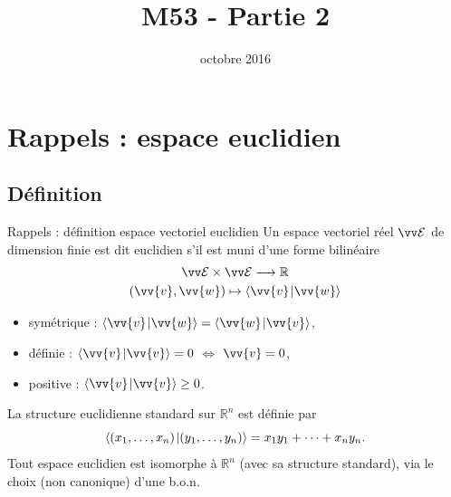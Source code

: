 \documentclass{m53beamer}
\title{M53 - Partie 2}
\date{octobre 2016}
\begin{document}
\begin{frame}
  \titlepage
\end{frame}

\section{Rappels : espace euclidien}
\subsection{Définition}
\begin{frame}{Rappels : définition espace vectoriel euclidien}
  Un espace vectoriel réel $\ev{E}$ de dimension finie est dit \alert{euclidien} s'il est muni d'une forme bilinéaire
    \begin{gather*}
      \ev{E} \times \ev{E} \longrightarrow \mathbb{R}\\
      (\vv{v},\vv{w}) \mapsto \scalprod{\vv{v}}{\vv{w}}
    \end{gather*}\vspace*{-1.4\baselineskip}
    \begin{itemize}[<+(1)->]
      \item symétrique : $\scalprod{\vv{v}}{\vv{w}} = \scalprod{\vv{w}}{\vv{v}}$,
      \item définie : $\scalprod{\vv{v}}{\vv{v}} = 0$ $\Leftrightarrow$ $\vv{v} = 0$,
      \item positive : $\scalprod{\vv{v}}{\vv{v}} \geq 0$.
    \end{itemize}\pause
  La structure euclidienne standard sur $\mathbb{R}^{n}$ est définie par
  \vspace*{-.7\baselineskip}
  \[
    \langle{(x_{1},\ldots,x_{n})}\kern1pt |{(y_{1},\ldots,y_{n})}\rangle=x_{1}y_{1}+\cdots+x_{n}y_{n}.
  \]\pause
  Tout espace euclidien est isomorphe à $\mathbb{R}^{n}$ (avec sa structure standard),\pause
  via le choix (non canonique) d'une b.o.n.
\end{frame}

\end{document}
